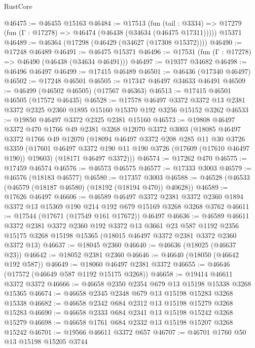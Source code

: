 \begin{lexlean}{RustCore}
\begin{coremodule}
@46475 := @46455 @15163
@46484 := @17513
    (fun (tail : @3334) => @17279 (fun (Γ : @17278) => @46474 (@46438 (@34634 (@46475 @17311)))))
    @15371
@46489 := @46364 (@17298 (@46429 (@34627 (@17308 @15372))))
@46490 := @17248 @46489
@46491 := @46475 @15371
@46496 := @17531 (fun (Γ : @17278) => @46490 (@46438 (@34634 @46491)))
@46497 := @19377 @34682
@46498 := @46496 @46497
@46499 := @17415 @46489
@46501 := @46436 (@17340 @46497)
@46502 := @17248 @46501
@46505 := @17347 @46497 @34633 @46491
@46509 := @46499 (@46502 @46505) (@17567 @46363)
@46513 := @17415 @46501 @46505 (@17572 @46435)
@46528 := @17578
    @46497
    @3372
    @3372
    @13
    @2381
    @3372
    @2325
    @2360
    @1895
    @15160
    @15370
    @192
    @3256
    @15152
    @3262
@46533 := @19850 @46497 @3372 @2325 @2381 @15160
@46573 := @19808
    @46497
    @3372
    @470
    @1766
    @49
    @2381
    @3268
    @12070
    @3372
    @3003
    (@18085
      @46497
      @3372
      @1766
      @49
      @12070
      (@18094
        @46497
        @3372
        @208
        @285
        @11
        @30
        @3726
        @3359
        (@17601 @46497 @3372 @190 @11 @190 @3726 (@17609 (@17610 @46497 @190)) @19603)
        (@18171 @46497 @3372)))
@46574 := @17262 @470
@46575 := @17459 @46574
@46576 := @46573 @46575
@46577 := @17333 @3003
@46579 := @46576 (@18183 @46577)
@46580 := @17357 @3003
@46588 := @46528 (@46533 (@46579 (@18187 @46580) (@18192 (@18194 @470)) @40628))
@46589 := @17626 @46497
@46606 := @46589
    @46497
    @3372
    @2381
    @3372
    @2360
    @1894
    @3372
    @13
    @15369
    @190
    @214
    @192
    @679
    @15169
    @3268
    @3268
    @3762
@46611 := @17544 (@17671 (@17549 @161 @17672)) @46497
@46636 := @46589
    @46611
    @3372
    @2381
    @3372
    @2360
    @192
    @3372
    @13
    @3661
    @23
    @587
    @1192
    @2356
    @15175
    @3268
    @15198
    @15365
    (@18015 @46497 @3372 @2381 @3372 @2360 @3372 @13)
@46637 := @18045 @2360
@46640 := @46636 (@18025 (@46637 @23))
@46642 := @18052 @2381 @2360
@46646 := @46640 (@18050 (@46642 @192 @587))
@46649 := @18060 @46497 @2381 @3372
@46655 := @46646 (@17572 (@46649 @587 @1192 @15175 @3268))
@46658 := @19414 @46611 @3372 @3372
@46666 := @46658 @2350 @2354 @679 @13 @15198 @15338 @3268 @15365
@46674 := @46658 @2345 @2348 @679 @13 @15198 @15283 @3268 @15338
@46682 := @46658 @2342 @684 @2312 @13 @15198 @15279 @3268 @15283
@46690 := @46658 @2333 @684 @2341 @13 @15198 @15242 @3268 @15279
@46698 := @46658 @1761 @684 @2332 @13 @15198 @15207 @3268 @15242
@46701 := @19566 @46611 @3372 @657
@46707 := @46701 @1760 @50 @13 @15198 @15205 @3744

\end{coremodule}
\end{lexlean}
